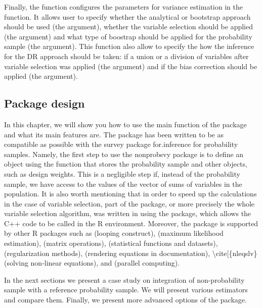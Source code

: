 \documentclass[
]{jss}
\begin{document}
Finally, the  function configures the parameters for
variance estimation in the  function. It allows user to
specify whether the analytical or bootstrap approach should be used (the
 argument), whether the variable selection should be
applied (the  argument) and what type of boostrap
should be applied for the probability sample (the 
argument). This function also allow to specify the how the inference for
the DR approach should be taken: if a union or a division of variables
after variable selection was applied (the  argument) and
if the bias correction should be applied (the 
argument).

\subsection{Package design}\label{package-design}

In this chapter, we will show you how to use the main 
function of the package and what its main features are. The package has
been written to be as compatible as possible with the survey package
for.inference for probability samples. Namely, the first step to use the
nonprobsvy package is to define an object using the 
function that stores the probability sample  and other
objects, such as design weights. This is a negligible step if, instead
of the probability sample, we have access to the values of the vector of
sums of variables in the population. It is also worth mentioning that in
order to speed up the calculations in the case of variable selection,
part of the package, or more precisely the whole variable selection
algorithm, was written in  using the 
\citep{Rcpp} package, which allows the C++ code to be called in the R
environment. Moreover, the package is supported by other R packages such
as  \citep{foreach} (looping construct), 
\citep{maxLik} (maximum likelihood estimation), 
\citep{Matrix} (matrix operations),  \citet{MASS} (statistical
functions and datasets),  \citep{ncvreg} (regularization
methods),  \citep{mathjaxr} (rendering equations in
documentation),  \textbackslash cite{[}\{nleqslv\} (solving
non-linear equations), and  \citep{doParallel} (parallel
computing).

In the next sections we present a case study on integration of
non-probability sample with a reference probability sample. We will
present various estimators and compare them. Finally, we present more
advanced options of the package.
\end{document}
